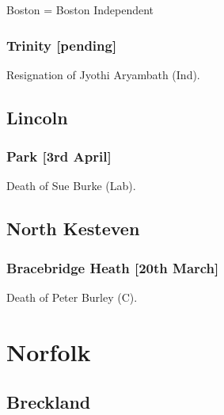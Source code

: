 \documentclass[a4paper,openany]{book}
\begin{document}
\begin{resultsiii}
Boston = Boston Independent

\subsubsection*{Trinity \hspace*{\fill}\nolinebreak[1]%
	\enspace\hspace*{\fill}
	[pending]}


Resignation of Jyothi Aryambath (Ind).

\subsection*{Lincoln}

\subsubsection*{Park \hspace*{\fill}\nolinebreak[1]%
	\enspace\hspace*{\fill}
	[3rd April]}


Death of Sue Burke (Lab).

\subsection*{North Kesteven}

\subsubsection*{Bracebridge Heath \hspace*{\fill}\nolinebreak[1]%
	\enspace\hspace*{\fill}
	[20th March]}


Death of Peter Burley (C).

\section{Norfolk}

\subsection*{Breckland}


\end{resultsiii}
\end{document}
